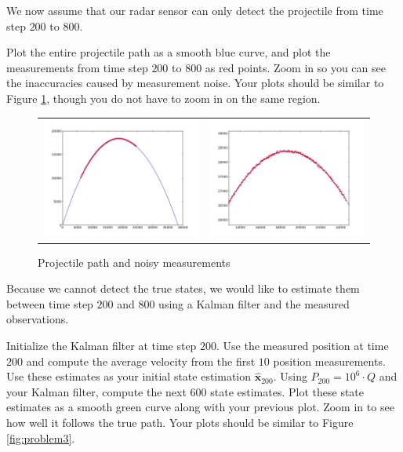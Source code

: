 We now assume that our radar sensor can only detect the projectile from time step $200$ to $800$.

\begin{problem}
Plot the entire projectile path as a smooth blue curve, and plot the measurements from time step $200$ to $800$ as red points.
Zoom in so you can see the inaccuracies caused by measurement noise. 
Your plots should be similar to Figure \ref{fig:problem2}, though you do not have to zoom in on the same region.
\label{prob:measurenoise}
\end{problem}

\begin{figure}
	\centering
	\begin{tabular}{cc} 
	\includegraphics[width=.49\textwidth]{problem2_1.jpg} & 
	\includegraphics[width=.49\textwidth]{problem2_2.jpg}
	\end{tabular}
	\caption{Projectile path and noisy measurements}
	\label{fig:problem2}
\end{figure}

Because we cannot detect the true states, we would like to estimate them between time step $200$ and $800$ using a Kalman filter and the measured observations.

\begin{problem}
Initialize the Kalman filter at time step $200$.
Use the measured position at time $200$ and compute the average velocity from the first $10$ position measurements.
Use these estimates as your initial state estimation $\widehat{\mathbf{x}}_{200}$. Using $P_{200} = 10^{6} \cdot Q$ and your Kalman filter, compute the next $600$ state estimates.
Plot these state estimates as a smooth green curve along with your previous plot. 
Zoom in to see how well it follows the true path. Your plots should be similar to Figure \ref{fig:problem3}.
\label{prob:state_estimate}
\end{problem}

